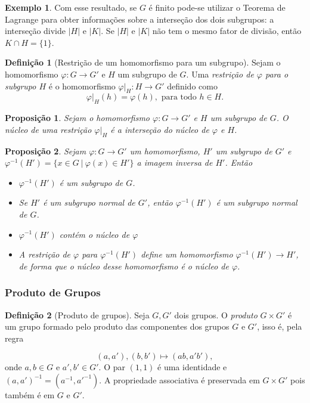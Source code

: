 \documentclass[a4paper,12pt]{report}
\theoremstyle{plain}
\newtheorem{proposicao}{Proposição}[section]
\theoremstyle{definition}
\newtheorem{definicao}{Definição}[section]
\newtheorem{exemplo}{Exemplo}[section]
\begin{document}
\begin{exemplo}
	Com esse resultado, se \(G\) é finito pode-se utilizar o
	Teorema de Lagrange para obter informações sobre a interseção dos dois
	subgrupos: a interseção divide \(|H|\) e \(|K|\). Se \(|H|\) e \(|K|\)
	não tem o mesmo fator de divisão, então \(K\cap H = \{1\}\).	
\end{exemplo}

\begin{definicao}[Restrição de um homomorfismo para um subgrupo]
	Sejam o homomorfismo \(\varphi:G\longrightarrow G'\)
	e \(H\) um subgrupo de \(G\). Uma \emph{restrição de \(\varphi\) para o subgrupo \(H\)} é o homomorfismo \(\varphi|_H:H\longrightarrow G'\)
	definido como
	\[\varphi|_H(h) = \varphi(h), \text{ para todo }h\in H.\]	
\end{definicao}

\begin{proposicao}
	Sejam o homomorfismo
	\(\varphi:G\longrightarrow G'\) e \(H\) um subgrupo de \(G\). O núcleo
	de uma restrição \(\varphi|_H\) é a interseção do núcleo de \(\varphi\)
	e \(H\).	
\end{proposicao}

\begin{proposicao}
	 Sejam \(\varphi:G\longrightarrow G'\) um
	homomorfismo, \(H'\) um subgrupo de \(G'\) e
	\(\varphi^{-1}(H') = \{x \in G \ | \ \varphi(x) \in H'\}\) a imagem
	inversa de \(H'\). Então
	\begin{itemize}
		\item \(\varphi^{-1}(H')\) é um subgrupo de \(G\).
		\item Se \(H'\) é um subgrupo normal de \(G'\), então \(\varphi^{-1}(H')\) é
		um subgrupo normal de \(G\).
		\item \(\varphi^{-1}(H')\) contém o núcleo de \(\varphi\)
		\item A restrição de \(\varphi\) para \(\varphi^{-1}(H')\) define um
		homomorfismo \(\varphi^{-1}(H')\longrightarrow H'\), de forma que o
		núcleo desse homomorfismo é o núcleo de \(\varphi\).
	\end{itemize}
\end{proposicao}

\subsubsection{Produto de Grupos}

\begin{definicao}[Produto de grupos]
	Seja \(G,G'\) dois grupos. O \emph{produto}
	\(G\times G'\) é um grupo formado pelo produto das componentes dos
	grupos \(G\) e \(G'\), isso é, pela regra
	
	\[ (a,a'), (b,b') \mapsto (ab,a'b'), \] onde \(a,b \in G\) e
	\(a',b'\in G'\). O par \((1,1)\) é uma identidade e
	\((a,a')^{-1} = (a^{-1},a'^{-1})\). A propriedade associativa é
	preservada em \(G\times G'\) pois também é em \(G\) e \(G'\).
\end{definicao}
\end{document}
